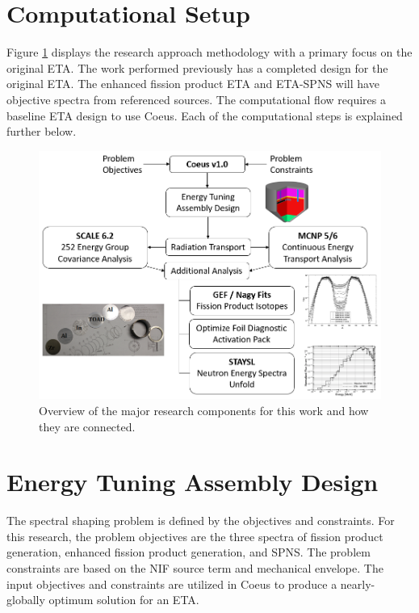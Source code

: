
\section{Computational Setup}
Figure \ref{fig:ETAFLOW} displays the research approach methodology with a primary focus on the original ETA. 
The work performed previously has a completed design for the original ETA. 
The enhanced fission product ETA and ETA-SPNS will have objective spectra from referenced sources. 
The computational flow requires a baseline ETA design to use Coeus. 
Each of the computational steps is explained further below. 

\begin{figure}[ht]
	\includegraphics[width=\linewidth]{Figures/Chapter1/ETAFLOW1.png}
	\caption{Overview of the major research components for this work and how they are connected.}
	\label{fig:ETAFLOW}
\end{figure}

\section{Energy Tuning Assembly Design}

The spectral shaping problem is defined by the objectives and constraints. 
For this research, the problem objectives are the three spectra of fission product generation, enhanced fission product generation, and SPNS. %
The problem constraints are based on the NIF source term and mechanical envelope. 
The input objectives and constraints are utilized in Coeus to produce a nearly-globally optimum solution for an ETA. 

